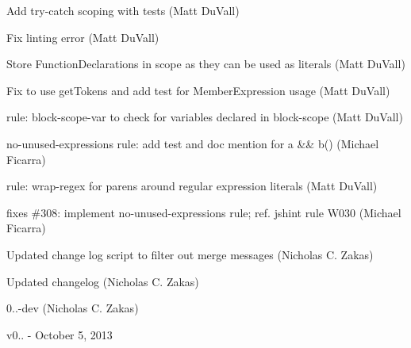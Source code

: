 \begin{DoxyItemize}
\item Add try-\/catch scoping with tests (Matt Du\+Vall)
\item Fix linting error (Matt Du\+Vall)
\item Store Function\+Declarations in scope as they can be used as literals (Matt Du\+Vall)
\item Fix to use get\+Tokens and add test for Member\+Expression usage (Matt Du\+Vall)
\item rule\+: block-\/scope-\/var to check for variables declared in block-\/scope (Matt Du\+Vall)
\item no-\/unused-\/expressions rule\+: add test and doc mention for {\ttfamily a \&\& b()} (Michael Ficarra)
\item rule\+: wrap-\/regex for parens around regular expression literals (Matt Du\+Vall)
\item fixes \#308\+: implement no-\/unused-\/expressions rule; ref. jshint rule W030 (Michael Ficarra)
\item Updated change log script to filter out merge messages (Nicholas C. Zakas)
\item Updated changelog (Nicholas C. Zakas)
\item 0..-\/dev (Nicholas C. Zakas)
\end{DoxyItemize}

v0.. -\/ October 5, 2013


